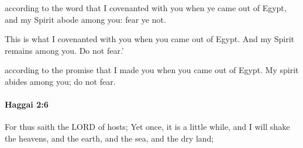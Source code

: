 			\begin{versebox}
					\item[BHS] 
					\item[LXX] 
					\item[ASV] according to the word that I covenanted with you when ye came out of Egypt, and my Spirit abode among you: fear ye not.
					\item[NIV] This is what I covenanted with you when you came out of Egypt. And my Spirit remains among you. Do not fear.’
					\item[NRSV] according to the promise that I made you when you came out of Egypt. My spirit abides among you; do not fear.
			\end{versebox}

		\paragraph{Haggai 2:6} %
			\label{HAGGAI-2-6}

			For thus saith the LORD of hosts; Yet once, it is a little while, and I will shake the heavens, and the earth, and the sea, and the dry land;


